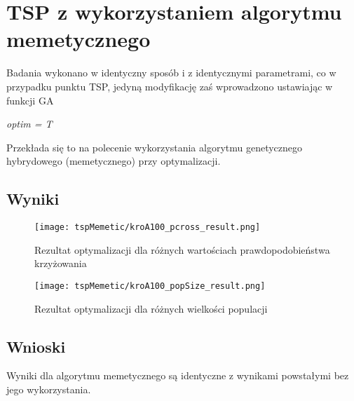 \section{TSP z wykorzystaniem algorytmu memetycznego}

Badania wykonano w identyczny sposób i z identycznymi parametrami, co w przypadku punktu TSP, jedyną modyfikację zaś wprowadzono ustawiając w funkcji GA

\textit{optim = T}

Przekłada się to na polecenie wykorzystania algorytmu genetycznego hybrydowego (memetycznego) przy optymalizacji.

\subsection{Wyniki}

\begin{figure}[H]
    \centering
    \texttt{[image: tspMemetic/kroA100\_pcross\_result.png]}
    \caption{Rezultat optymalizacji dla różnych wartościach prawdopodobieństwa krzyżowania}
\end{figure}

\begin{figure}[H]
    \centering
    \texttt{[image: tspMemetic/kroA100\_popSize\_result.png]}
    \caption{Rezultat optymalizacji dla różnych wielkości populacji}
\end{figure}


\subsection{Wnioski}

Wyniki dla algorytmu memetycznego są identyczne z wynikami powstałymi bez jego wykorzystania.
